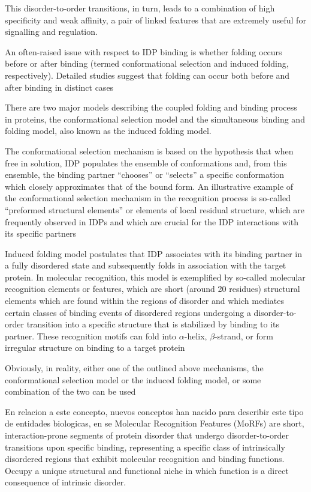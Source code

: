This disorder-to-order transitions, in turn, leads to a combination of high specificity and weak affinity, a pair of linked features that are extremely useful for signalling and regulation.

An often-raised issue with respect to IDP binding is whether folding occurs before or after binding (termed conformational selection and induced folding, respectively).
Detailed studies suggest that folding can occur both before and after binding in distinct cases


There are two major models describing the coupled folding and binding process in proteins, the conformational selection model and the simultaneous binding and folding model, also known as the induced folding model.

The conformational selection mechanism is based on the hypothesis that when free in solution, IDP populates the ensemble of conformations and, from this ensemble, the binding partner “chooses” or
“selects” a specific conformation which closely approximates that of the bound form. An illustrative example of the conformational selection mechanism in the recognition process is
so-called “preformed structural elements” or elements of local residual structure, which are frequently observed in IDPs and which are crucial for the IDP interactions with its specific
partners

Induced folding model postulates that IDP associates with its binding partner in a fully disordered state and subsequently folds in association with the target protein. 
In molecular recognition, this model is exemplified by so-called molecular recognition elements or features, which are short (around 20 residues) structural elements which are found 
within the regions of disorder and which mediates certain classes of binding
events of disordered regions undergoing a disorder-to-order transition into a specific structure that is stabilized by binding to its partner.
These recognition motifs can fold into $\alpha$-helix, $\beta$-strand, or form irregular structure on binding to a target protein

Obviously, in reality, either one of the outlined above mechanisms, the conformational selection model or the induced folding model, or some combination of the two can be used


En relacion a este concepto, nuevos conceptos han nacido para describir este tipo de entidades biologicas, en \cite{oldfield2005coupled} se 
Molecular Recognition Features (MoRFs) are short, interaction-prone segments of protein disorder that undergo disorder-to-order transitions upon specific binding, 
representing a specific class of intrinsically disordered regions that exhibit molecular recognition and binding functions.
Occupy a unique structural and functional niche in which function is a direct consequence of intrinsic disorder.

